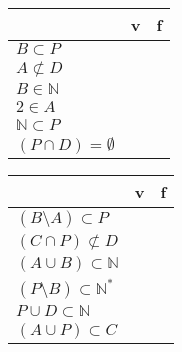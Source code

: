 \begin{questions}
\begin{minipage}{\linewidth}
\begin{multicols}{2}
	\begin{tabular}{|l|c|c|}
		\hline
		& v & f  \\
		\hline
		$B\subset P$          & \solonly{\checkmark }    &    \\
		\hline
		$A\not\subset D$      & \solonly{\checkmark }    &    \\
		\hline
		$B\in\mathbb{N}$      &   &  \solonly{\checkmark }    \\
		\hline
		$2\in A$              &   &  \solonly{\checkmark }    \\
		\hline
		$\mathbb{N}\subset P$ &   &  \solonly{\checkmark }    \\
		\hline
		$(P\cap D)=\emptyset$      & \solonly{\checkmark }    &    \\
		\hline
	\end{tabular}
	
	\begin{tabular}{|l|c|c|}
		\hline
		& v & f \\ \hline
		
		$(B\setminus A)\subset P$           &  \solonly{\checkmark } &   \\ \hline
		
		$(C\cap P)\not\subset D$            &   & \solonly{\checkmark }  \\ \hline
		
		$(A\cup B)\subset\mathbb{N}$        &   &  \solonly{\checkmark } \\ \hline
		
		$(P\setminus B)\subset\mathbb{N}^*$ & \solonly{\checkmark }  &   \\ \hline
		
		$P\cup D\subset\mathbb{N}$          & \solonly{\checkmark }  &   \\ \hline
		
		$(A\cup P)\subset C$                &   &   \solonly{\checkmark }\\ \hline
	\end{tabular}
	
\end{multicols}
\end{minipage}







 
\end{questions}